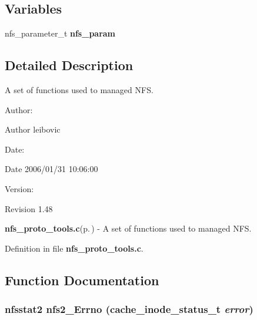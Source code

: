 \subsection*{Variables}
\begin{CompactItemize}
\item 
nfs\_\-parameter\_\-t {\bf nfs\_\-param}
\end{CompactItemize}


\subsection{Detailed Description}
A set of functions used to managed NFS. 

\begin{Desc}
\item[Author:]\begin{Desc}
\item[Author]leibovic \end{Desc}
\end{Desc}
\begin{Desc}
\item[Date:]\begin{Desc}
\item[Date]2006/01/31 10:06:00 \end{Desc}
\end{Desc}
\begin{Desc}
\item[Version:]\begin{Desc}
\item[Revision]1.48 \end{Desc}
\end{Desc}
{\bf nfs\_\-proto\_\-tools.c}{\rm (p.\,\pageref{nfs__proto__tools_8c})} - A set of functions used to managed NFS.

Definition in file {\bf nfs\_\-proto\_\-tools.c}.

\subsection{Function Documentation}
\subsubsection{\setlength{\rightskip}{0pt plus 5cm}nfsstat2 nfs2\_\-Errno (cache\_\-inode\_\-status\_\-t {\em error})}\label{nfs__proto__tools_8c_a28}


